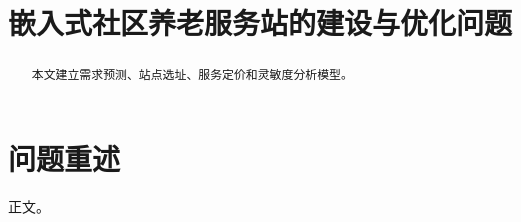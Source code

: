 \documentclass{cumcmthesis}
\title{嵌入式社区养老服务站的建设与优化问题}
\begin{document}
\maketitle
\begin{abstract}
本文建立需求预测、站点选址、服务定价和灵敏度分析模型。
\end{abstract}
\section{问题重述}
正文。
\end{document}

